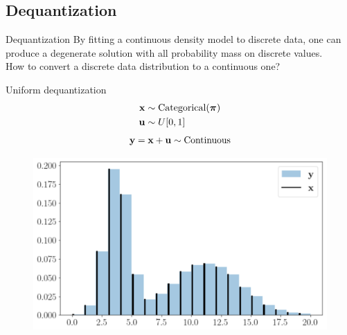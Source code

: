 \subsection{Dequantization}
\begin{frame}{Dequantization}
	By fitting a continuous density model to discrete data, one can produce a degenerate solution with all probability mass on discrete values. \\
	How to convert a discrete data distribution to a continuous one?
	
	\begin{minipage}[t]{0.5\columnwidth}
		\begin{block}{Uniform dequantization}
			\vspace{-0.5cm}
			\begin{align*}
				\mathbf{x} &\sim \text{Categorical}(\boldsymbol{\pi}) \\
				\mathbf{u} &\sim U[0, 1]
			\end{align*}
			\[
			\mathbf{y} = \mathbf{x} + \mathbf{u} \sim \text{Continuous} 
			\]
		\end{block}
	\end{minipage}%
	\begin{minipage}[t]{0.5\columnwidth}
		\begin{figure}
			\centering
			\includegraphics[width=1.0\linewidth]{figs/uniform_dequantization.png}
		\end{figure}
	\end{minipage}
\end{frame}
